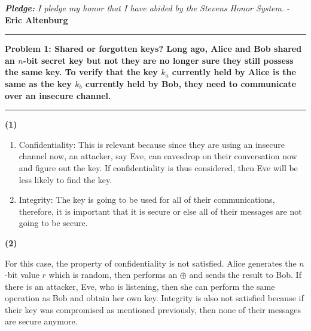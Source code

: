 \documentclass[11pt]{article}
\newcommand\question[2]{\vspace{.25in}\hrule\textbf{#1: #2}\vspace{.5em}\hrule\vspace{.10in}}
\renewcommand\part[1]{\vspace{.10in}\textbf{(#1)}\par}
\begin{document}
\newcommand\NAME{Eric Altenburg}  %
\newcommand\COURSE{CS-306}
\newcommand\HWNUM{1}              %
\newcommand{\bigO}{\mathcal{O}}


\begin{center}
	\textit{\textbf{Pledge:} I pledge my honor that I have abided by the Stevens Honor System.} - \textbf{\NAME}
\end{center}

\question{Problem 1}{Shared or forgotten keys? \newline Long ago, Alice and Bob shared an $n$-bit secret key but not they are no longer sure they still possess the same key. To verify that the key $k_a$ currently held by Alice is the same as the key $k_b$ currently held by Bob, they need to communicate over an insecure channel.}
	\part{1}
		\begin{enumerate}
			\item Confidentiality: This is relevant because since they are using an insecure channel now, an attacker, say Eve, can eavesdrop on their conversation now and figure out the key. If confidentiality is thus considered, then Eve will be less likely to find the key.
			\item Integrity: The key is going to be used for all of their communications, therefore, it is important that it is secure or else all of their messages are not going to be secure.
		\end{enumerate}
	\part{2}
		For this case, the property of confidentiality is not satisfied. Alice generates the $n$-bit value $r$ which is random, then performs an $\oplus$ and sends the result to Bob. If there is an attacker, Eve, who is listening, then she can perform the same operation as Bob and obtain her own key. Integrity is also not satisfied because if their key was compromised as mentioned previously, then none of their messages are secure anymore.
\end{document}
